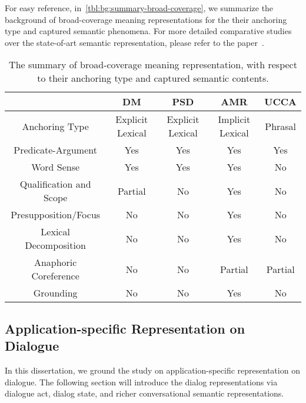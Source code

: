 For easy reference, in~\autoref{tbl:bg:summary-broad-coverage}, we
summarize the background of broad-coverage meaning representations for
the their anchoring type and captured semantic phenomena. For more
detailed comparative studies over the state-of-art semantic
representation, please refer to the paper~\citep{abend2017state}.

\begin{table}[!tbp]
\caption{The summary of broad-coverage meaning representation, with respect to their anchoring type and captured semantic contents.}
  \begin{center}
\setlength{\tabcolsep}{3pt}
{
\begin{tabular}{c|cccc}
  \toprule
  \hline
  & {\bf DM}               & {\bf PSD}              & {\bf AMR}              & {\bf UCCA}    \\ \hline
  Anchoring Type          & Explicit Lexical & Explicit Lexical & Implicit Lexical & Phrasal \\ \hline
  Predicate-Argument      & Yes              & Yes              & Yes              & Yes     \\
  Word Sense              & Yes              & Yes              & Yes              & No      \\
  Qualification and Scope & Partial          & No               & Yes              & No      \\
  Presupposition/Focus    & No               & No               & Yes              & No      \\
  Lexical Decomposition   & No               & No               & Yes              & No      \\
  Anaphoric Coreference   & No               & No               & Partial          & Partial \\
  Grounding               & No               & No               & Yes              & No \\ \hline
  \bottomrule

\end{tabular}}
\end{center}
\label{tbl:bg:summary-broad-coverage}
\end{table}


\subsection{Application-specific Representation on Dialogue}
\label{ssec:bg:dialogue-mr}

In this dissertation, we ground the study on application-specific
representation on dialogue. The following section will introduce the
dialog representations via dialogue act, dialog state, and richer
conversational semantic representations.

